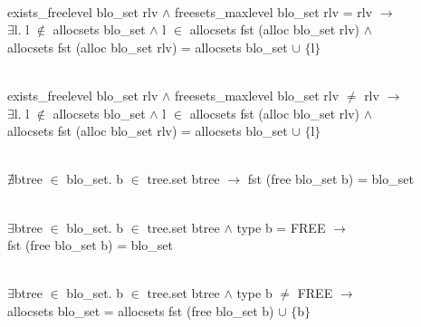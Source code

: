 \documentclass[runningheads]{llncs}
\begin{document}
\begin{definition}  \\
exists\_freelevel blo\_set rlv $\wedge$ freesets\_maxlevel blo\_set rlv = rlv $\longrightarrow$ \\
\phantom{x} \hspace{10pt} $\exists$l. l $\notin$ allocsets blo\_set $\wedge$ l $\in$ allocsets fst (alloc blo\_set rlv) $\wedge$ \\
\phantom{x} \hspace{10pt} allocsets fst (alloc blo\_set rlv) = allocsets blo\_set $\cup$ $\lbrace$l$\rbrace$
\label{pp3}
\end{definition}

\begin{definition}  \\
exists\_freelevel blo\_set rlv $\wedge$ freesets\_maxlevel blo\_set rlv $\neq$ rlv $\longrightarrow$ \\
\phantom{x} \hspace{10pt} $\exists$l. l $\notin$ allocsets blo\_set $\wedge$ l $\in$ allocsets fst (alloc blo\_set rlv) $\wedge$ \\
\phantom{x} \hspace{10pt} allocsets fst (alloc blo\_set rlv) = allocsets blo\_set $\cup$ $\lbrace$l$\rbrace$
\label{pp4}
\end{definition}

\begin{definition}  \\
$\nexists$btree $\in$ blo\_set. b $\in$ tree.set btree $\longrightarrow$ fst (free blo\_set b) = blo\_set
\label{pp5}
\end{definition}

\begin{definition}  \\
$\exists$btree $\in$ blo\_set. b $\in$ tree.set btree $\wedge$ type b = FREE $\longrightarrow$ \\
\phantom{x} \hspace{10pt} fst (free blo\_set b) = blo\_set
\label{pp6}
\end{definition}

\begin{definition}  \\
$\exists$btree $\in$ blo\_set. b $\in$ tree.set btree $\wedge$ type b $\neq$ FREE $\longrightarrow$ \\
\phantom{x} \hspace{10pt} allocsets blo\_set = allocsets fst (free blo\_set b) $\cup$ $\lbrace$b$\rbrace$
\label{pp7}
\end{definition}
\end{document}
